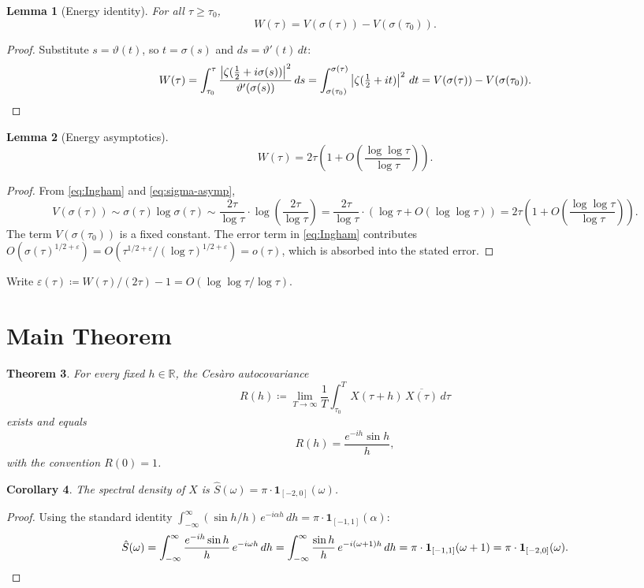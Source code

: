 \documentclass{amsart}
\newtheorem{theorem}{Theorem}
\newtheorem{corollary}[theorem]{Corollary}
\newtheorem{lemma}[theorem]{Lemma}
\newcommand{\assign}{\coloneqq}
\newcommand{\abs}[1]{\left|#1\right|}
\begin{document}
\begin{lemma}[Energy identity]\label{lem:energy}
For all $\tau \ge \tau_0$,
\[
  W(\tau) = V(\sigma(\tau)) - V(\sigma(\tau_0)).
\]
\end{lemma}
\begin{proof}
Substitute $s = \vartheta(t)$, so $t = \sigma(s)$ and $ds = \vartheta'(t)\,dt$:
\[
  W(\tau) = \int_{\tau_0}^{\tau} \frac{\abs{\zeta(\tfrac{1}{2}+i\sigma(s))}^2}{\vartheta'(\sigma(s))}\,ds
  = \int_{\sigma(\tau_0)}^{\sigma(\tau)} \abs{\zeta(\tfrac{1}{2}+it)}^2\,dt
  = V(\sigma(\tau)) - V(\sigma(\tau_0)). \qedhere
\]
\end{proof}

\begin{lemma}[Energy asymptotics]\label{lem:W-asymp}
\[
  W(\tau) = 2\tau\!\left(1 + O\!\left(\frac{\log\log\tau}{\log\tau}\right)\right).
\]
\end{lemma}
\begin{proof}
From \eqref{eq:Ingham} and \eqref{eq:sigma-asymp},
\[
  V(\sigma(\tau)) \sim \sigma(\tau)\log\sigma(\tau)
  \sim \frac{2\tau}{\log\tau}\cdot\log\!\left(\frac{2\tau}{\log\tau}\right)
  = \frac{2\tau}{\log\tau}\cdot\left(\log\tau + O(\log\log\tau)\right)
  = 2\tau\!\left(1 + O\!\left(\frac{\log\log\tau}{\log\tau}\right)\right).
\]
The term $V(\sigma(\tau_0))$ is a fixed constant. The error term in
\eqref{eq:Ingham} contributes $O(\sigma(\tau)^{1/2+\varepsilon}) =
O(\tau^{1/2+\varepsilon}/(\log\tau)^{1/2+\varepsilon}) = o(\tau)$, which is
absorbed into the stated error.
\end{proof}

Write $\varepsilon(\tau) \assign W(\tau)/(2\tau) - 1 = O(\log\log\tau/\log\tau)$.

\section{Main Theorem}

\begin{theorem}\label{thm:cov}
For every fixed $h \in \mathbb{R}$, the Ces\`aro autocovariance
\[
  R(h) \assign \lim_{T\to\infty} \frac{1}{T}\int_{\tau_0}^T
  X(\tau+h)\,\overline{X(\tau)}\,d\tau
\]
exists and equals
\[
  R(h) = \frac{e^{-ih}\sin h}{h},
\]
with the convention $R(0) = 1$.
\end{theorem}

\begin{corollary}\label{cor:spectral}
The spectral density of $X$ is $\hat{S}(\omega) = \pi\cdot\mathbf{1}_{[-2,0]}(\omega)$.
\end{corollary}
\begin{proof}
Using the standard identity $\int_{-\infty}^{\infty}(\sin h/h)\,e^{-i\alpha h}\,dh
= \pi\cdot\mathbf{1}_{[-1,1]}(\alpha)$:
\[
  \hat{S}(\omega)
  = \int_{-\infty}^{\infty} \frac{e^{-ih}\sin h}{h}\,e^{-i\omega h}\,dh
  = \int_{-\infty}^{\infty} \frac{\sin h}{h}\,e^{-i(\omega+1)h}\,dh
  = \pi\cdot\mathbf{1}_{[-1,1]}(\omega+1)
  = \pi\cdot\mathbf{1}_{[-2,0]}(\omega). \qedhere
\]
\end{proof}
\end{document}
